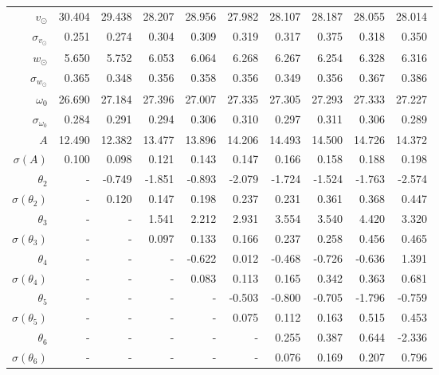 \documentclass{matmex-diploma-custom}
\begin{document}
\begin{table}[h!!]
\begin{tabular}{r|rrrrrrrrr}
 $v_{\odot} $& 30.404      &  29.438 &  28.207 &  28.956 &  27.982 &  28.107 &  28.187 &  28.055 &  28.014 \\
 $\sigma_{v_{\odot}}$&0.251       &   0.274 &   0.304 &   0.309 &   0.319 &   0.317 &   0.375 &   0.318 &    0.350 \\
 $w_{\odot} $& 5.650       &   5.752 &   6.053 &   6.064 &   6.268 &   6.267 &   6.254 &   6.328 &   6.316 \\
 $\sigma_{w_{\odot}}$&0.365       &   0.348 &   0.356 &   0.358 &   0.356 &   0.349 &   0.356 &   0.367 &   0.386 \\
 $\omega_0 $&26.690      &  27.184 &  27.396 &  27.007 &  27.335 &  27.305 &  27.293 &  27.333 &  27.227 \\
 $\sigma_{\omega_0} $& 0.284       &   0.291 &   0.294 &   0.306 &    0.310 &   0.297 &   0.311 &   0.306 &   0.289 \\
 $A $&12.490      &  12.382 &  13.477 &  13.896 &  14.206 &  14.493 &    14.500 &  14.726 &  14.372 \\
 $\sigma(A) $ & 0.100       &   0.098 &   0.121 &   0.143 &   0.147 &   0.166 &   0.158 &   0.188 &   0.198 \\
 $\theta_2$&-        &  -0.749 &  -1.851 &  -0.893 &  -2.079 &  -1.724 &  -1.524 &  -1.763 &  -2.574 \\
 $\sigma(\theta_2)$&-      &    0.120 &   0.147 &   0.198 &   0.237 &   0.231 &   0.361 &   0.368 &   0.447 \\
 $\theta_3$&-      &    - &   1.541 &   2.212 &   2.931 &   3.554 &   3.540 &   4.420 &   3.320 \\
 $\sigma(\theta_3)$&-      &    - &   0.097 &   0.133 &   0.166 &   0.237 &   0.258 &   0.456 &   0.465 \\
 $\theta_4$&-      &    - &    - &  -0.622 &   0.012 &  -0.468 &  -0.726 &  -0.636 &   1.391 \\
 $\sigma(\theta_4)$&-      &    - &    - &     0.083 &   0.113 &   0.165 &   0.342 &   0.363 &   0.681 \\
 $\theta_5$&-      &    - &    - &    - &  -0.503 &  -0.800 &  -0.705 &  -1.796 &  -0.759 \\
 $\sigma(\theta_5)$&-      &    - &    - &    - &     0.075 &   0.112 &   0.163 &   0.515 &   0.453 \\
 $\theta_6$&-      &    - &    - &    - &    - &   0.255 &   0.387 &   0.644 &  -2.336 \\
 $\sigma(\theta_6)$&-    &    - &    - &    - &    - &   0.076 &   0.169 &   0.207 &   0.796 \\

\end{tabular}
\end{table}
\end{document}
